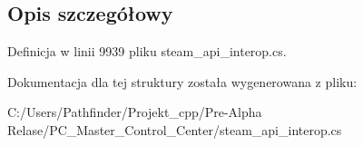 \subsection{Opis szczegółowy}


Definicja w linii 9939 pliku steam\+\_\+api\+\_\+interop.\+cs.



Dokumentacja dla tej struktury została wygenerowana z pliku\+:\begin{DoxyCompactItemize}
\item 
C\+:/\+Users/\+Pathfinder/\+Projekt\+\_\+cpp/\+Pre-\/\+Alpha Relase/\+P\+C\+\_\+\+Master\+\_\+\+Control\+\_\+\+Center/steam\+\_\+api\+\_\+interop.\+cs\end{DoxyCompactItemize}
